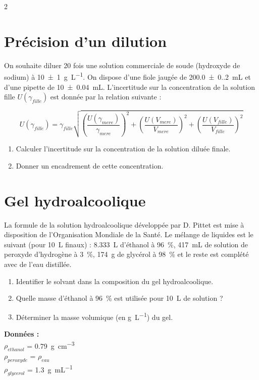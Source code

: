 \documentclass[a4paper,11pt,fleqn]{article}%
\begin{document}
\begin{multicols}{2}
\section{Précision d'un dilution}
On souhaite diluer 20 fois une solution commerciale de soude (hydroxyde de sodium) à \SI[separate-uncertainty = true]{10(1)}{\gram\per\liter}. On dispose d'une fiole jaugée de \SI[separate-uncertainty = true]{200.0(0.2)}{\milli\liter} et d'une pipette de \SI[separate-uncertainty = true]{10(0.04)}{\milli\liter}. L'incertitude sur la concentration de la solution fille $U(\gamma_{fille})$ est donnée par la relation suivante :
\begin{footnotesize} $$U(\gamma_{fille}) = \gamma_{fille} \sqrt{\left(\dfrac{U(\gamma_{mere})}{\gamma_{mere}}\right)^2 + \left(\dfrac{U(V_{mere})}{V_{mere}}\right)^2 + \left(\dfrac{U(V_{fille})}{V_{fille}}\right)^2}$$\end{footnotesize}
\begin{enumerate}
	\item Calculer l'incertitude sur la concentration de la solution diluée finale.
	\item Donner un encadrement de cette concentration.
\end{enumerate}

\section{Gel hydroalcoolique}
La formule de la solution hydroalcoolique développée par D. Pittet est mise à disposition de l'Organisation Mondiale de la Santé. Le mélange de liquides est le suivant (pour \SI{10}{L} finaux) : \SI{8.333}{L} d'éthanol à \SI{96}{\percent}, \SI{417}{mL} de solution de peroxyde d'hydrogène à \SI{3}{\percent}, \SI{174}{g} de glycérol à \SI{98}{\percent} et le reste est complété avec de l'eau distillée.
\begin{enumerate}
	\item Identifier le solvant dans la composition du gel hydroalcoolique.
	\item Quelle masse d'éthanol à \SI{96}{\percent} est utilisée pour \SI{10}{L} de solution ?
	\item Déterminer la masse volumique (en \unit{\gram\per\liter}) du gel.
\end{enumerate}

\textbf{Données :}\\
$\rho_{ethanol}$ = \SI{0,79}{\gram\per\centi\meter\cubed}\\
$\rho_{peroxyde}$ = $\rho_{eau}$\\
$\rho_{glycerol}$ = \SI{1.3}{\gram\per\milli\liter}


\end{multicols}
\end{document}
